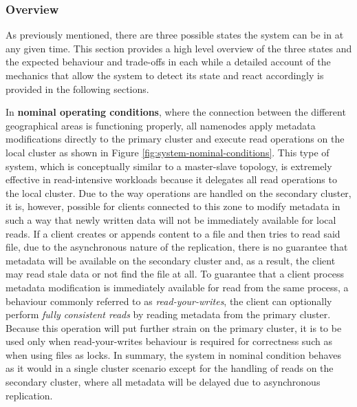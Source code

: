 \subsubsection{Overview}
As previously mentioned, there are three possible states the system can be in at any given time.
This section provides a high level overview of the three states and the expected behaviour and trade-offs in each while a detailed account of the mechanics that allow the system to detect its state and react accordingly is provided in the following sections.

In \textbf{nominal operating conditions}, where the connection between the different geographical areas is functioning properly, all namenodes apply metadata modifications directly to the primary cluster and execute read operations on the local cluster as shown in Figure \ref{fig:system-nominal-conditions}.
This type of system, which is conceptually similar to a master-slave topology, is extremely effective in read-intensive workloads because it delegates all read operations to the local cluster.
Due to the way operations are handled on the secondary cluster, it is, however, possible for clients connected to this zone to modify metadata in such a way that newly written data will not be immediately available for local reads.
If a client creates or appends content to a file and then tries to read said file, due to the asynchronous nature of the replication, there is no guarantee that metadata will be available on the secondary cluster and, as a result, the client may read stale data or not find the file at all.
To guarantee that a client process metadata modification is immediately available for read from the same process, a behaviour commonly referred to as \emph{read-your-writes}, the client can optionally perform \emph{fully consistent reads} by reading metadata from the primary cluster.
Because this operation will put further strain on the primary cluster, it is to be used only when read-your-writes behaviour is required for correctness such as when using files as locks.
In summary, the system in nominal condition behaves as it would in a single cluster scenario except for the handling of reads on the secondary cluster, where all metadata will be delayed due to asynchronous replication.

